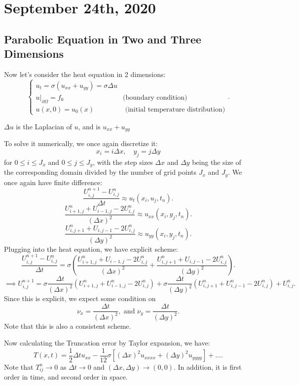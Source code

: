 \documentclass[../main/main.tex]{subfiles}
\begin{document}
\section{September 24th, 2020}
\subsection{Parabolic Equation in Two and Three Dimensions}
Now let's consider the heat equation in 2 dimensions: \[
\begin{cases}
    u_t = \sigma(u_{x x } + u_{yy}) = \sigma \Delta u \\
    u\rvert_{\partial \Omega} = f_0 & \text{(boundary condition)} \\ 
    u(x, 0 ) = u_0(x) & \text{ (initial temperature distribution)}
\end{cases}
.\] 
\begin{remark}
   $\Delta u$ is the Laplacian of  $u$, and is $u_{x x} + u_{y y}$
\end{remark}
To solve it numerically, we once again discretize it: \[
x_i = i \Delta x, \quad y_j = j\Delta y
\]  for $0\le  i \le  J_x$ and $0\le j\le J_y$, with the step sizes $\Delta x$ and  $\Delta y$ being the size of the corresponding domain divided by the number of grid points  $J_x$ and  $J_y$.  We once again have finite difference:  \[
    \frac{U_{i,j}^{n+1}-U_{i,j}^n}{\Delta t}\approx u_t(x_i,u_j,t_n)
.\] \[
\frac{U_{i+1,j}^n + U_{i-1,j}- 2U_{i,j}^n}{(\Delta x)^2}\approx u_{x x } (x_i,y_j, t_n)
.\] \[ 
\frac{U_{i,j+1}^n + U_{i,j-1}- 2U_{i,j}^n}{(\Delta y)^2}\approx u_{y y } (x_i,y_j, t_n)
.\] Plugging into the heat equation, we have explicit scheme: \[
    \frac{U_{i,j}^{n+1}-U_{i,j}^n}{\Delta t} = \sigma
    \left(
\frac{U_{i+1,j}^n + U_{i-1,j}- 2U_{i,j}^n}{(\Delta x)^2} + 
\frac{U_{i,j+1}^n + U_{i,j-1}- 2U_{i,j}^n}{(\Delta y)^2}\right)
.\] \[
\implies U_{i,j}^{n+1} = \sigma \frac{\Delta t}{(\Delta x)^2} \left( U_{i+1,j}^n + U_{i-1,j}^n - 2U_{i,j}^n \right) +\sigma \frac{\Delta t}{(\Delta y)^2} \left( U_{i,j+1}^n + U_{i,j-1}^n - 2U_{i,j}^n \right)  + U_{i,j}^n 
.\] 
Since this is explicit, we expect some condition on \[
    \nu_x = \frac{\Delta t}{(\Delta x)^2}, \text{ and } \nu_y = \frac{\Delta t}{(\Delta y)^2}
.\] 
Note that this is also a consistent scheme.

Now calculating the Truncation error by Taylor expansion, we have: \[
    T(x,t) = \frac{1}{2}\Delta t u_{x x } - \frac{1}{12}\sigma \left[ (\Delta x)^2 u_{x x x x} + (\Delta y)^2 u_{y y y y}\right] + \ldots
.\] Note that $T_{ij}^n \to  0$ as $\Delta t \to  0$ and $(\Delta x, \Delta y) \to  (0,0)$. In addition, it is first order in time, and second order in space.
\end{document}
